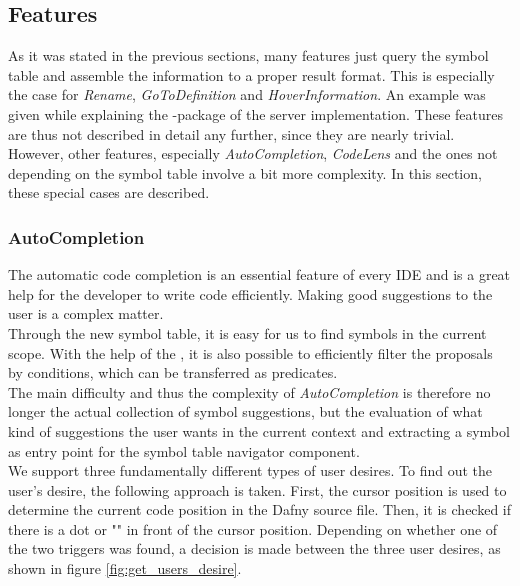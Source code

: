 \subsection{Features}
\label{section:imp:features}
As it was stated in the previous sections, many features just query the symbol table and assemble the information to a proper result format.
This is especially the case for \textit{Rename}, \textit{GoToDefinition} and \textit{HoverInformation}.
An example was given while explaining the -package of the server implementation.
These features are thus not described in detail any further, since they are nearly trivial.
However, other features, especially \textit{AutoCompletion}, \textit{CodeLens} and the ones not depending on the symbol table involve a bit more complexity.
In this section, these special cases are described.

\subsubsection{AutoCompletion}
\label{section:implementation:core:completion}
The automatic code completion is an essential feature of every IDE and is a great help for the developer to write code efficiently.
Making good suggestions to the user is a complex matter. \\

Through the new symbol table, it is easy for us to find symbols in the current scope.
With the help of the ,
it is also possible to efficiently filter the proposals by conditions,
which can be transferred as predicates. \\

The main difficulty and thus the complexity of \textit{AutoCompletion}
is therefore no longer the actual collection of symbol suggestions,
but the evaluation of what kind of suggestions the user wants in the current context
and extracting a symbol as entry point for the symbol table navigator component. \\

We support three fundamentally different types of user desires.
To find out the user's desire, the following approach is taken.
First, the cursor position is used to determine the current code position in the Dafny source file.
Then, it is checked if there is a dot or "" in front of the cursor position.
Depending on whether one of the two triggers was found,
a decision is made between the three user desires, as shown in figure \ref{fig:get_users_desire}.

